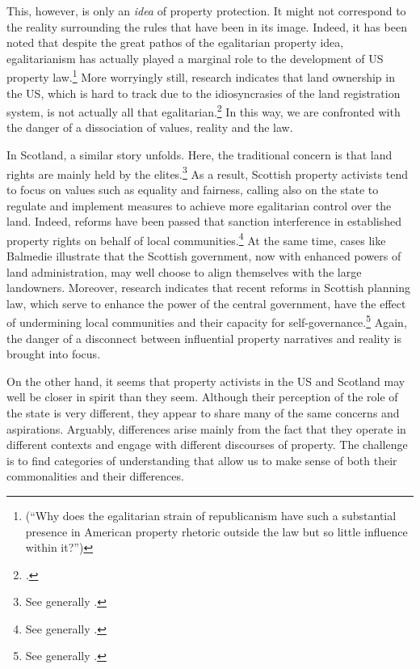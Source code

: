 This, however, is only an {\it idea} of property protection. It might not correspond to the reality surrounding the rules that have been  in its image. Indeed, it has been noted that despite the great pathos of the egalitarian property idea, egalitarianism has actually played a marginal role to the development of US property law.\footnote{\cite[361]{williams98} (``Why does the egalitarian strain of republicanism have such a substantial presence in American property rhetoric outside the law but so little influence within it?'')} More worryingly still, research indicates that land ownership in the US, which is hard to track due to the idiosyncrasies of the land registration system, is not actually all that egalitarian.\footcite[246-247]{jacobs98} In this way, we are confronted with the danger of a dissociation of values, reality and the law.

In Scotland, a similar story unfolds. Here, the traditional concern is that land rights are mainly held by the elites.\footnote{See generally \cite{wightman96,wightman13}.} As a result, Scottish property activists tend to focus on values such as equality and fairness, calling also on the state to regulate and implement measures to achieve more egalitarian control over the land. Indeed, reforms have been passed that sanction interference in established property rights on behalf of local communities.\footnote{See generally \cite{lovett11,hoffman13}.} At the same time, cases like Balmedie illustrate that the Scottish government, now with enhanced powers of land administration, may well choose to align themselves with the large landowners. Moreover, research indicates that recent reforms in Scottish planning law, which serve to enhance the power of the central government, have the effect of undermining local communities and their capacity for self-governance.\footnote{See generally \cite{pacione13,pacione14}.} Again, the danger of a disconnect between influential property narratives and reality is brought into focus.

On the other hand, it seems that  property activists in the US and Scotland may well be closer in spirit than they seem. Although their perception of the role of the state is very different, they appear to share many of the same concerns and aspirations. Arguably, differences arise mainly from the fact that they operate in different contexts and engage with different discourses of property. The challenge is to find categories of understanding that allow us to make sense of both their commonalities and their differences.

